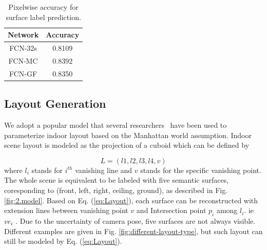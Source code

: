 \begin{table}
	\centering
	\caption{Pixelwise accuracy for surface label prediction.}
	\label{table:fcn-accuracy}
	\begin{tabular}{c|c}
		\hline
	Network & Accuracy\\
	\hline
	FCN-32s & 0.8109 \\ 
	FCN-MC  & 0.8392 \\
	FCN-GF  & 0.8350 \\
		\hline
	\end{tabular}
		
\end{table}







\subsection{Layout Generation}
\label{subsection:optimization}
We adopt a popular model that several  researchers~\cite{wang2013discriminative,dasgupta2016delay,ren2016coarse} have been used to parameterize indoor layout based on the Manhattan world assumption. 
Indoor scene layout is modeled as the projection of a cuboid which can be defined by 

\begin{equation}
	\label{eq:Layout}
	L = (l1, l2, l3, l4, v)
\end{equation}
where $l_{i}$ stands for $i^{th}$ vanishing line and $v$ stands for the specific vanishing point. The whole scene is equivalent to be labeled with five semantic surfaces, coresponding to (front, left, right, ceiling, ground), as described in Fig. \ref{fig:2.model}. Based on Eq. (\ref{eq:Layout}), each surface can be reconstructed with extension lines between vanishing point $v$ and Intersection point $p_i$ among $l_{i}$. ie $ve_i$ . Due to the uncertainty of camera pose, five surfaces are not always visible. Different examples are given in Fig. \ref{fig:different-layout-type}, but such layout can still be modeled by Eq. (\ref{eq:Layout}).

